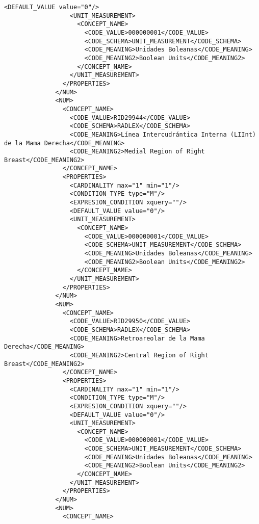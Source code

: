 \begin{lstlisting}[label=some-code,caption=Some Code]
                  <DEFAULT_VALUE value="0"/>
                  <UNIT_MEASUREMENT>
                    <CONCEPT_NAME>
                      <CODE_VALUE>000000001</CODE_VALUE>
                      <CODE_SCHEMA>UNIT_MEASUREMENT</CODE_SCHEMA>
                      <CODE_MEANING>Unidades Boleanas</CODE_MEANING>
                      <CODE_MEANING2>Boolean Units</CODE_MEANING2>
                    </CONCEPT_NAME>
                  </UNIT_MEASUREMENT>
                </PROPERTIES>
              </NUM>
              <NUM>
                <CONCEPT_NAME>
                  <CODE_VALUE>RID29944</CODE_VALUE>
                  <CODE_SCHEMA>RADLEX</CODE_SCHEMA>
                  <CODE_MEANING>Línea Intercudrántica Interna (LIInt) de la Mama Derecha</CODE_MEANING>
                  <CODE_MEANING2>Medial Region of Right Breast</CODE_MEANING2>
                </CONCEPT_NAME>
                <PROPERTIES>
                  <CARDINALITY max="1" min="1"/>
                  <CONDITION_TYPE type="M"/>
                  <EXPRESION_CONDITION xquery=""/>
                  <DEFAULT_VALUE value="0"/>
                  <UNIT_MEASUREMENT>
                    <CONCEPT_NAME>
                      <CODE_VALUE>000000001</CODE_VALUE>
                      <CODE_SCHEMA>UNIT_MEASUREMENT</CODE_SCHEMA>
                      <CODE_MEANING>Unidades Boleanas</CODE_MEANING>
                      <CODE_MEANING2>Boolean Units</CODE_MEANING2>
                    </CONCEPT_NAME>
                  </UNIT_MEASUREMENT>
                </PROPERTIES>
              </NUM>
              <NUM>
                <CONCEPT_NAME>
                  <CODE_VALUE>RID29950</CODE_VALUE>
                  <CODE_SCHEMA>RADLEX</CODE_SCHEMA>
                  <CODE_MEANING>Retroareolar de la Mama Derecha</CODE_MEANING>
                  <CODE_MEANING2>Central Region of Right Breast</CODE_MEANING2>
                </CONCEPT_NAME>
                <PROPERTIES>
                  <CARDINALITY max="1" min="1"/>
                  <CONDITION_TYPE type="M"/>
                  <EXPRESION_CONDITION xquery=""/>
                  <DEFAULT_VALUE value="0"/>
                  <UNIT_MEASUREMENT>
                    <CONCEPT_NAME>
                      <CODE_VALUE>000000001</CODE_VALUE>
                      <CODE_SCHEMA>UNIT_MEASUREMENT</CODE_SCHEMA>
                      <CODE_MEANING>Unidades Boleanas</CODE_MEANING>
                      <CODE_MEANING2>Boolean Units</CODE_MEANING2>
                    </CONCEPT_NAME>
                  </UNIT_MEASUREMENT>
                </PROPERTIES>
              </NUM>
              <NUM>
                <CONCEPT_NAME>

\end{lstlisting}
